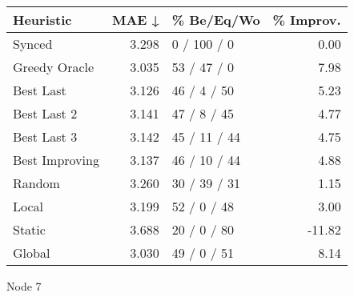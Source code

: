 \begin{tabular}{lrlr}
\toprule
\textbf{Heuristic} & \textbf{MAE ↓} & \textbf{\% Be/Eq/Wo} & \textbf{\% Improv.} \\
\midrule
            Synced &          3.298 &          0 / 100 / 0 &                0.00 \\
     Greedy Oracle &          3.035 &          53 / 47 / 0 &                7.98 \\
         Best Last &          3.126 &          46 / 4 / 50 &                5.23 \\
       Best Last 2 &          3.141 &          47 / 8 / 45 &                4.77 \\
       Best Last 3 &          3.142 &         45 / 11 / 44 &                4.75 \\
    Best Improving &          3.137 &         46 / 10 / 44 &                4.88 \\
            Random &          3.260 &         30 / 39 / 31 &                1.15 \\
             Local &          3.199 &          52 / 0 / 48 &                3.00 \\
            Static &          3.688 &          20 / 0 / 80 &              -11.82 \\
            Global &          3.030 &          49 / 0 / 51 &                8.14 \\
\bottomrule
\end{tabular}
\caption{Node 7}
\label{tab:ds_iid_lr05_le1_bs2_7}
